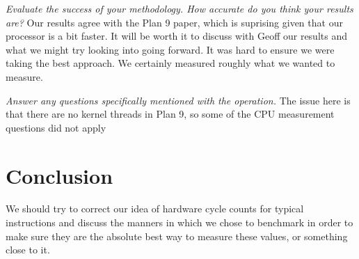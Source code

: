 \documentclass[letterpaper,twocolumn,10pt]{article}
\begin{document}
    
    \textit{Evaluate the success of your methodology. How accurate do you think your results are?}
    Our results agree with the Plan 9 paper, which is suprising given that our processor is a bit faster. It will be worth it to discuss with Geoff our results and what we might try looking into going forward. It was hard to ensure we were taking the best approach. We certainly measured roughly what we wanted to measure.

\textit{Answer any questions specifically mentioned with the operation.}
The issue here is that there are no kernel threads in Plan 9, so some of the CPU measurement questions did not apply

\section{Conclusion}

We should try to correct our idea of hardware cycle counts for typical instructions and discuss the manners in which we chose to benchmark in order to make sure they are the absolute best way to measure these values, or something close to it. 

{\normalsize 
}


\end{document}
